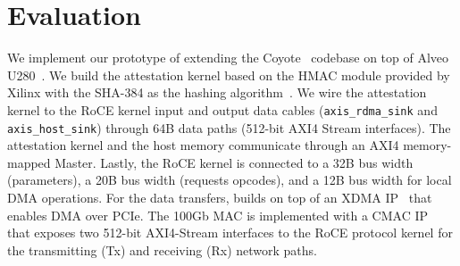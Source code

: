 \section{Evaluation}
\label{sec:eval}
We implement our prototype of \projecttitle{} extending the Coyote~\cite{coyote} codebase on top of Alveo U280~\cite{u280_smartnics}. We build the attestation kernel based on the HMAC module provided by Xilinx with the SHA-384 as the hashing algorithm~\cite{vitis-security-lib}. We wire the attestation kernel to the RoCE kernel input and output data cables (\texttt{axis\_rdma\_sink} and \texttt{axis\_host\_sink}) through 64B data paths (512-bit AXI4 Stream interfaces). The attestation kernel and the host memory communicate through an AXI4 memory-mapped Master. Lastly, the RoCE kernel is connected to a 32B bus width (parameters), a 20B bus width (requests opcodes), and a 12B bus width for local DMA operations. For the data transfers, \projecttitle{} builds on top of an XDMA IP~\cite{xdma, fpga_dma} that enables DMA over PCIe. The 100Gb MAC is implemented with a CMAC IP~\cite{license} that exposes two 512-bit AXI4-Stream interfaces to the RoCE protocol kernel for the transmitting (Tx) and receiving (Rx) network paths.





